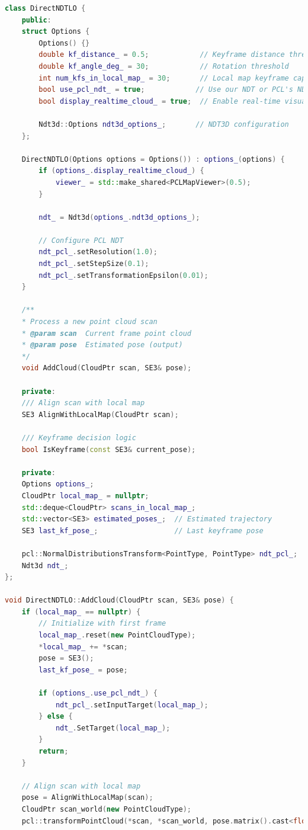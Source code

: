 \begin{lstlisting}[language=c++, caption=src/ch7/direct\_ndt\_lo.cc]
class DirectNDTLO {
	public:
	struct Options {
		Options() {}
		double kf_distance_ = 0.5;            // Keyframe distance threshold
		double kf_angle_deg_ = 30;            // Rotation threshold
		int num_kfs_in_local_map_ = 30;       // Local map keyframe capacity  
		bool use_pcl_ndt_ = true;            // Use our NDT or PCL's NDT
		bool display_realtime_cloud_ = true;  // Enable real-time visualization
		
		Ndt3d::Options ndt3d_options_;       // NDT3D configuration
	};
	
	DirectNDTLO(Options options = Options()) : options_(options) {
		if (options_.display_realtime_cloud_) {
			viewer_ = std::make_shared<PCLMapViewer>(0.5);
		}
		
		ndt_ = Ndt3d(options_.ndt3d_options_);
		
		// Configure PCL NDT
		ndt_pcl_.setResolution(1.0);
		ndt_pcl_.setStepSize(0.1);
		ndt_pcl_.setTransformationEpsilon(0.01);
	}
	
	/**
	* Process a new point cloud scan
	* @param scan  Current frame point cloud  
	* @param pose  Estimated pose (output)
	*/
	void AddCloud(CloudPtr scan, SE3& pose);
	
	private:
	/// Align scan with local map
	SE3 AlignWithLocalMap(CloudPtr scan);
	
	/// Keyframe decision logic
	bool IsKeyframe(const SE3& current_pose);
	
	private:
	Options options_;
	CloudPtr local_map_ = nullptr;
	std::deque<CloudPtr> scans_in_local_map_;
	std::vector<SE3> estimated_poses_;  // Estimated trajectory
	SE3 last_kf_pose_;                  // Last keyframe pose
	
	pcl::NormalDistributionsTransform<PointType, PointType> ndt_pcl_;
	Ndt3d ndt_;
};

void DirectNDTLO::AddCloud(CloudPtr scan, SE3& pose) {
	if (local_map_ == nullptr) {
		// Initialize with first frame
		local_map_.reset(new PointCloudType);
		*local_map_ += *scan;
		pose = SE3();
		last_kf_pose_ = pose;
		
		if (options_.use_pcl_ndt_) {
			ndt_pcl_.setInputTarget(local_map_);
		} else {
			ndt_.SetTarget(local_map_);
		}
		return;
	}
	
	// Align scan with local map
	pose = AlignWithLocalMap(scan);
	CloudPtr scan_world(new PointCloudType);
	pcl::transformPointCloud(*scan, *scan_world, pose.matrix().cast<float>());
	

\end{lstlisting}
